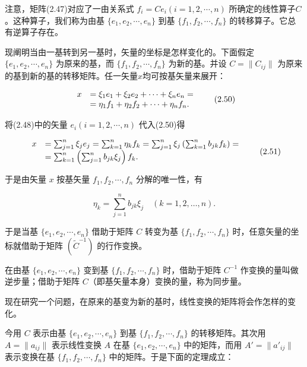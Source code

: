 注意，矩阵(2.47)对应了一由关系式 $f_{i}=Ce_{i}(i=1,2,\cdots,n)$ 所确定的线性算子$C$。这种算子，我们称为由基 $\{e_{1}, e_{2}, \cdots, e_{n}\}$ 到基 $\{f_{1}, f_{2}, \cdots, f_{n}\}$ 的转移算子。它总有逆算子存在。

现阐明当由一基转到另一基时，矢量的坐标是怎样变化的。下面假定 $\{e_{1}, e_{2}, \cdots, e_{n}\}$ 为原来的基，而 $\{f_{1}, f_{2}, \cdots, f_{n}\}$ 为新的基。并设 $C = \|C_{ij}\|$ 为原来的基到新的基的转移矩阵。任一矢量$x$均可按基矢量来展开：

\begin{equation*}
\begin{array}{r l} x & = \xi_ {1} e _ {1} + \xi_ {2} e _ {2} + \dots + \xi_ {n} e _ {n} = \\ & = \eta_ {1} f _ {1} + \eta_ {2} f _ {2} + \dots + \eta_ {n} f _ {n}. \end{array}\tag{2.50}
\end{equation*}

将(2.48)中的矢量 $e_{i}(i=1,2,\cdots,n)$ 代入(2.50)得

\begin{equation*}
\begin{array}{r l} x & = \sum_ {j = 1} ^ {n} \xi_ {j} e _ {j} = \sum_ {k = 1} ^ {n} \eta_ {k} f _ {k} = \sum_ {j = 1} ^ {n} \xi_ {j} \left(\sum_ {k = 1} ^ {n} b _ {j k} f _ {k}\right) = \\ & = \sum_ {k = 1} ^ {n} \left(\sum_ {j = 1} ^ {n} b _ {j k} \xi_ {j}\right) f _ {k}. \end{array}\tag{2.51}
\end{equation*}

于是由矢量 $x$ 按基矢量 $f_{1}, f_{2}, \cdots, f_{n}$ 分解的唯一性，有

\begin{equation*}
\eta_ {k} = \sum_ {j = 1} ^ {n} b _ {j k} \xi_ {j} \quad (k = 1, 2, \dots , n).\tag{2.52}
\end{equation*}

于是当基 $\{e_{1}, e_{2}, \cdots, e_{n}\}$ 借助于矩阵 $C$ 转变为基 $\{f_{1}, f_{2}, \cdots, f_{n}\}$ 时，任意矢量的坐标就借助于矩阵 $(\widetilde{C}^{-1})$ 的行作变换。

在由基 $\{e_{1}, e_{2}, \cdots, e_{n}\}$ 变到基 $\{f_{1}, f_{2}, \cdots, f_{n}\}$ 时，借助于矩阵 $C^{-1}$ 作变换的量叫做逆步量；借助于矩阵 $C$（即基矢量本身）变换的量，称为同步量。

现在研究一个问题，在原来的基变为新的基时，线性变换的矩阵将会作怎样的变化。

今用 $C$ 表示由基 $\{e_{1}, e_{2}, \cdots, e_{n}\}$ 到基 $\{f_{1}, f_{2}, \cdots, f_{n}\}$ 的转移矩阵。其次用 $A = \|a_{ij}\|$ 表示线性变换 $A$ 在基 $\{e_{1}, e_{2}, \cdots, e_{n}\}$ 中的矩阵，而用 $A' = \|a'_{ij}\|$ 表示变换在基 $\{f_{1}, f_{2}, \cdots, f_{n}\}$ 中的矩阵。于是下面的定理成立：


